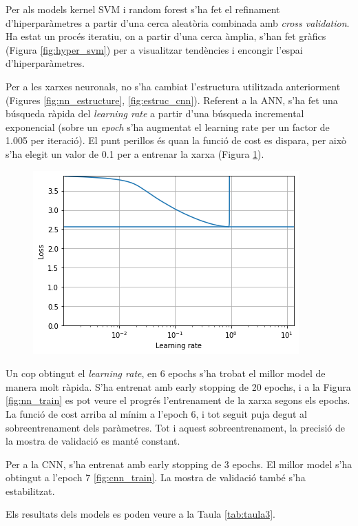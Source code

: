 \documentclass[12pt, spanish]{article}
\begin{document}
Per als models kernel SVM i random forest s'ha fet el refinament d'hiperparàmetres a partir d'una cerca aleatòria combinada amb \textit{cross validation}. Ha estat un procés iteratiu, on a partir d'una cerca àmplia, s'han fet gràfics (Figura \ref{fig:hyper_svm}) per a visualitzar tendències i encongir l'espai d'hiperparàmetres. 

Per a les xarxes neuronals, no s'ha cambiat l'estructura utilitzada anteriorment (Figures \ref{fig:nn_estructure}, \ref{fig:estruc_cnn}). Referent a la ANN, s'ha fet una búsqueda ràpida del \textit{learning rate} a partir d'una búsqueda incremental exponencial (sobre un \textit{epoch} s'ha augmentat el learning rate per un factor de 1.005 per iteració). El punt perillos és quan la funció de cost es dispara, per això s'ha elegit un valor de 0.1 per a entrenar la xarxa (Figura \ref{fig:learningRate}). 

\begin{figure}[hbt!]
\centering
\includegraphics[width = 0.5\linewidth]{images/lr.png}
\label{fig:learningRate}
\end{figure}

Un cop obtingut el \textit{learning rate}, en 6 epochs s'ha trobat el millor model de manera molt ràpida. S'ha entrenat amb early stopping de 20 epochs, i a la Figura \ref{fig:nn_train} es pot veure el progrés l'entrenament de la xarxa segons els epochs. La funció de cost arriba al mínim a l'epoch 6, i tot seguit puja degut al sobreentrenament dels paràmetres. Tot i aquest sobreentrenament, la precisió de la mostra de validació es manté constant.

Per a la CNN, s'ha entrenat amb early stopping de 3 epochs. El millor model s'ha obtingut a l'epoch 7 \ref{fig:cnn_train}. La mostra de validació també s'ha estabilitzat. 

Els resultats dels models es poden veure a la Taula \ref{tab:taula3}.
\end{document}
